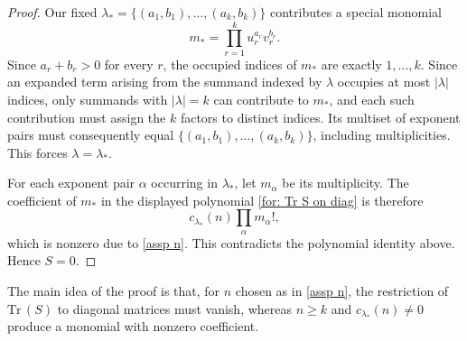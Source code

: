 \documentclass[11pt,reqno]{amsart}
\theoremstyle{definition}
\newcommand{\Tr}{\mathrm{Tr} \,}
\begin{document}
\begin{proof}
Our fixed \(\lambda_\ast = \{(a_1,b_1),\ldots,(a_k,b_k)\}\) contributes a special monomial
\[
m_*=\prod_{r=1}^{k}u_r^{a_r}v_r^{b_r}.
\]
Since \(a_r+b_r>0\) for every \(r\),
the occupied indices of \(m_*\) are exactly \(1,\ldots,k\).
Since an expanded term arising from the summand indexed by
\(\lambda\) occupies at most \(|\lambda|\) indices,
only summands with \(|\lambda|=k\) can contribute to
\(m_*\), and each such contribution must assign the \(k\)
factors to distinct indices.
Its multiset of exponent pairs must consequently equal
\(\{(a_1,b_1),\ldots,(a_k,b_k)\}\), including multiplicities.
This forces \(\lambda=\lambda_*\).

For each exponent pair \(\alpha\) occurring in \(\lambda_\ast\),
let \(m_\alpha\) be its multiplicity.
The coefficient of
\(m_*\) in the displayed polynomial \eqref{for: Tr S on diag} is therefore
\[
c_{\lambda_*}(n)\prod_\alpha m_\alpha!,
\]
which is nonzero due to \eqref{assp n}. This contradicts the polynomial identity
above. Hence \(S=0\).
\end{proof}
The main idea of the proof is that, for \(n\) chosen as in \eqref{assp n}, the restriction of \( \Tr(S) \) to diagonal matrices must vanish, whereas \(n\geq k\) and \(c_{\lambda_*}(n)\ne0\) produce a monomial with nonzero coefficient.
\end{document}
